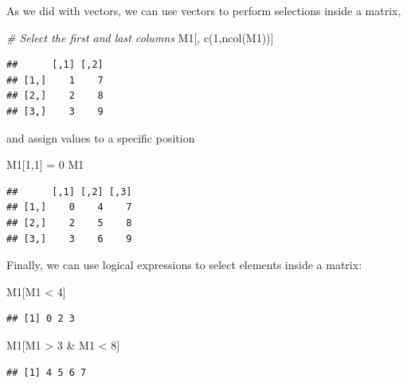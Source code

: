 \documentclass[
]{book}
\newenvironment{Shaded}{\begin{snugshade}}{\end{snugshade}}
\newcommand{\CommentTok}[1]{\textcolor[rgb]{0.56,0.35,0.01}{\textit{#1}}}
\newcommand{\DecValTok}[1]{\textcolor[rgb]{0.00,0.00,0.81}{#1}}
\newcommand{\FunctionTok}[1]{\textcolor[rgb]{0.00,0.00,0.00}{#1}}
\newcommand{\NormalTok}[1]{#1}
\newcommand{\OtherTok}[1]{\textcolor[rgb]{0.56,0.35,0.01}{#1}}
\newcommand{\SpecialCharTok}[1]{\textcolor[rgb]{0.00,0.00,0.00}{#1}}
\begin{document}
As we did with vectors, we can use vectors to perform selections inside a matrix,

\begin{Shaded}
\begin{Highlighting}[]
\CommentTok{\# Select the first and last columns}
\NormalTok{M1[, }\FunctionTok{c}\NormalTok{(}\DecValTok{1}\NormalTok{,}\FunctionTok{ncol}\NormalTok{(M1))]}
\end{Highlighting}
\end{Shaded}

\begin{verbatim}
##      [,1] [,2]
## [1,]    1    7
## [2,]    2    8
## [3,]    3    9
\end{verbatim}

and assign values to a specific position

\begin{Shaded}
\begin{Highlighting}[]
\NormalTok{M1[}\DecValTok{1}\NormalTok{,}\DecValTok{1}\NormalTok{] }\OtherTok{=} \DecValTok{0}
\NormalTok{M1}
\end{Highlighting}
\end{Shaded}

\begin{verbatim}
##      [,1] [,2] [,3]
## [1,]    0    4    7
## [2,]    2    5    8
## [3,]    3    6    9
\end{verbatim}

Finally, we can use logical expressions to select elements inside a matrix:

\begin{Shaded}
\begin{Highlighting}[]
\NormalTok{M1[M1 }\SpecialCharTok{\textless{}} \DecValTok{4}\NormalTok{]}
\end{Highlighting}
\end{Shaded}

\begin{verbatim}
## [1] 0 2 3
\end{verbatim}

\begin{Shaded}
\begin{Highlighting}[]
\NormalTok{M1[M1 }\SpecialCharTok{\textgreater{}} \DecValTok{3} \SpecialCharTok{\&}\NormalTok{ M1 }\SpecialCharTok{\textless{}} \DecValTok{8}\NormalTok{]}
\end{Highlighting}
\end{Shaded}

\begin{verbatim}
## [1] 4 5 6 7
\end{verbatim}
\end{document}
